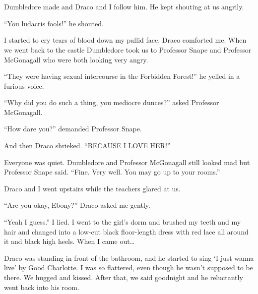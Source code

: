 \section{\chaptername~\thesection}



Dumbledore made and Draco and I follow him. He kept shouting at us angrily.

\enquote{You ludacris fools!} he shouted.

I started to cry tears of blood down my pallid face. Draco comforted me. When we went back to the castle Dumbledore took us to Professor Snape and Professor McGonagall who were both looking very angry.

\enquote{They were having sexual intercourse in the Forbidden Forest!} he yelled in a furious voice.

\enquote{Why did you do such a thing, you mediocre dunces?} asked Professor McGonagall.

\enquote{How dare you?} demanded Professor Snape.

And then Draco shrieked. \enquote{BECAUSE I LOVE HER!}

Everyone was quiet. Dumbledore and Professor McGonagall still looked mad but Professor Snape said. \enquote{Fine. Very well. You may go up to your rooms.}

Draco and I went upstairs while the teachers glared at us.

\enquote{Are you okay, Ebony?} Draco asked me gently.

\enquote{Yeah I guess.} I lied. I went to the girl's dorm and brushed my teeth and my hair and changed into a low-cut black floor-length dress with red lace all around it and black high heels. When I came out\ldots

Draco was standing in front of the bathroom, and he started to sing \enquote*{I just wanna live} by Good Charlotte. I was so flattered, even though he wasn't supposed to be there. We hugged and kissed. After that, we said goodnight and he reluctantly went back into his room.
